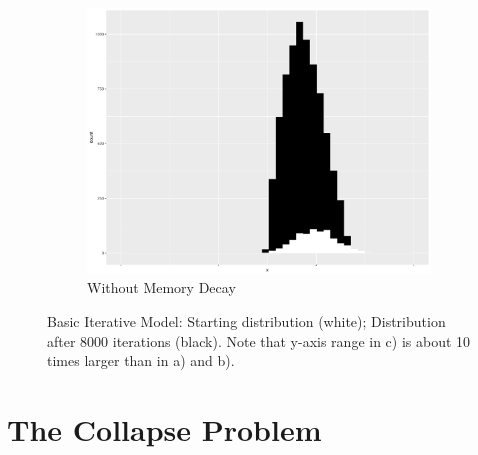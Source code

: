 \begin{figure}[H]
\begin{subfigure}[t]{.3\textwidth}
        \includegraphics[width=\linewidth]{figures/8000iternomemory.pdf}
        \caption{\label{fig:No-memory-decay:}Without Memory Decay}
    \end{subfigure}
\caption{\label{fig:First Model param}Basic Iterative Model: Starting distribution
(white); Distribution after 8000 iterations (black). Note that y-axis
range in c) is about 10 times larger than in a) and b).}
\end{figure}


\section{\label{sec:Iterativity}The Collapse Problem}

